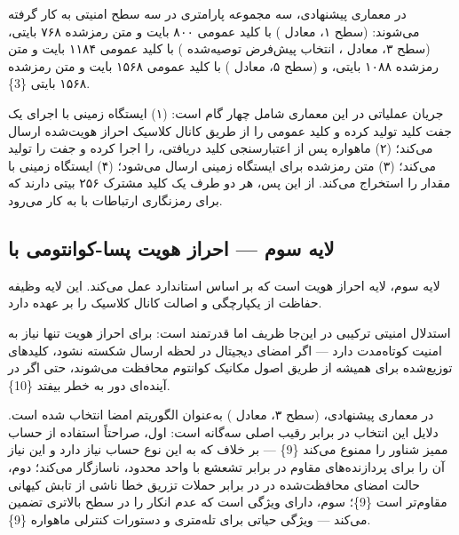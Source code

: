 \documentclass[a4paper,14pt]{extreport}
\begin{document}
در معماری پیشنهادی، سه مجموعه پارامتری  در سه سطح امنیتی  به کار گرفته می‌شوند:  (سطح ۱، معادل ) با کلید عمومی ۸۰۰ بایت و متن رمزشده ۷۶۸ بایتی،  (سطح ۳، معادل ، انتخاب پیش‌فرض توصیه‌شده ) با کلید عمومی ۱۱۸۴ بایت و متن رمزشده ۱۰۸۸ بایتی، و  (سطح ۵، معادل ) با کلید عمومی ۱۵۶۸ بایت و متن رمزشده ۱۵۶۸ بایتی \{3\}.

جریان عملیاتی  در این معماری شامل چهار گام است: (۱) ایستگاه زمینی با اجرای  یک جفت کلید تولید کرده و کلید عمومی را از طریق کانال کلاسیک احراز هویت‌شده ارسال می‌کند؛ (۲) ماهواره پس از اعتبارسنجی کلید دریافتی،  را اجرا کرده و جفت  را تولید می‌کند؛ (۳) متن رمزشده  برای ایستگاه زمینی ارسال می‌شود؛ (۴) ایستگاه زمینی با  مقدار  را استخراج می‌کند. از این پس، هر دو طرف یک کلید مشترک ۲۵۶ بیتی دارند که برای رمزنگاری ارتباطات با  به کار می‌رود.

\subsection{لایه سوم --- احراز هویت پسا-کوانتومی با }

لایه سوم، لایه احراز هویت  است که بر اساس استاندارد  عمل می‌کند. این لایه وظیفه حفاظت از یکپارچگی و اصالت کانال کلاسیک  را بر عهده دارد.

استدلال امنیتی ترکیبی در این‌جا ظریف اما قدرتمند است:  برای احراز هویت  تنها نیاز به امنیت کوتاه‌مدت  دارد --- اگر امضای دیجیتال در لحظه ارسال شکسته نشود، کلیدهای  توزیع‌شده برای همیشه از طریق اصول مکانیک کوانتوم محافظت می‌شوند، حتی اگر  در آینده‌ای دور به خطر بیفتد \{10\}.

در معماری پیشنهادی،  (سطح ۳، معادل ) به‌عنوان الگوریتم امضا انتخاب شده است. دلایل این انتخاب در برابر رقیب اصلی  سه‌گانه است: اول،  صراحتاً استفاده از حساب ممیز شناور  را ممنوع می‌کند \{9\} --- بر خلاف  که به این نوع حساب نیاز دارد و این نیاز آن را برای پردازنده‌های مقاوم در برابر تشعشع با واحد  محدود، ناسازگار می‌کند؛ دوم، حالت امضای محافظت‌شده  در  در برابر حملات تزریق خطا  ناشی از تابش کیهانی مقاوم‌تر است \{9\}؛ سوم،  دارای ویژگی  است که عدم انکار  را در سطح بالاتری تضمین می‌کند --- ویژگی حیاتی برای تله‌متری و دستورات کنترلی ماهواره \{9\}.
\end{document}
